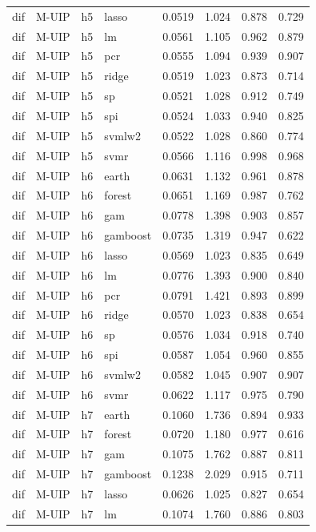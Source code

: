 \begin{ThreePartTable}
\begin{longtable}[t]{llclcccc}
dif & M-UIP & h5 & lasso & 0.0519 & 1.024 & 0.878 & 0.729\\
dif & M-UIP & h5 & lm & 0.0561 & 1.105 & 0.962 & 0.879\\
dif & M-UIP & h5 & pcr & 0.0555 & 1.094 & 0.939 & 0.907\\
dif & M-UIP & h5 & ridge & 0.0519 & 1.023 & 0.873 & 0.714\\
dif & M-UIP & h5 & sp & 0.0521 & 1.028 & 0.912 & 0.749\\
dif & M-UIP & h5 & spi & 0.0524 & 1.033 & 0.940 & 0.825\\
dif & M-UIP & h5 & svmlw2 & 0.0522 & 1.028 & 0.860 & 0.774\\
dif & M-UIP & h5 & svmr & 0.0566 & 1.116 & 0.998 & 0.968\\
\addlinespace
dif & M-UIP & h6 & earth & 0.0631 & 1.132 & 0.961 & 0.878\\
dif & M-UIP & h6 & forest & 0.0651 & 1.169 & 0.987 & 0.762\\
dif & M-UIP & h6 & gam & 0.0778 & 1.398 & 0.903 & 0.857\\
dif & M-UIP & h6 & gamboost & 0.0735 & 1.319 & 0.947 & 0.622\\
dif & M-UIP & h6 & lasso & 0.0569 & 1.023 & 0.835 & 0.649\\
dif & M-UIP & h6 & lm & 0.0776 & 1.393 & 0.900 & 0.840\\
dif & M-UIP & h6 & pcr & 0.0791 & 1.421 & 0.893 & 0.899\\
dif & M-UIP & h6 & ridge & 0.0570 & 1.023 & 0.838 & 0.654\\
dif & M-UIP & h6 & sp & 0.0576 & 1.034 & 0.918 & 0.740\\
dif & M-UIP & h6 & spi & 0.0587 & 1.054 & 0.960 & 0.855\\
dif & M-UIP & h6 & svmlw2 & 0.0582 & 1.045 & 0.907 & 0.907\\
dif & M-UIP & h6 & svmr & 0.0622 & 1.117 & 0.975 & 0.790\\
\addlinespace
dif & M-UIP & h7 & earth & 0.1060 & 1.736 & 0.894 & 0.933\\
dif & M-UIP & h7 & forest & 0.0720 & 1.180 & 0.977 & 0.616\\
dif & M-UIP & h7 & gam & 0.1075 & 1.762 & 0.887 & 0.811\\
dif & M-UIP & h7 & gamboost & 0.1238 & 2.029 & 0.915 & 0.711\\
dif & M-UIP & h7 & lasso & 0.0626 & 1.025 & 0.827 & 0.654\\
dif & M-UIP & h7 & lm & 0.1074 & 1.760 & 0.886 & 0.803\\

\end{longtable}
\end{ThreePartTable}
